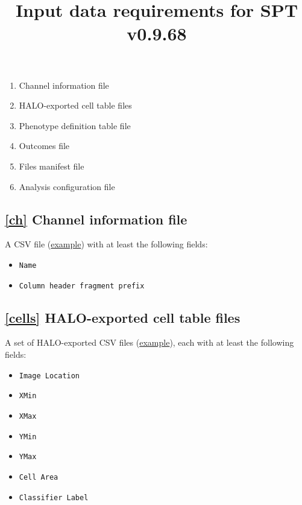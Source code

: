 \documentclass[14pt]{article}
\begin{document}
\title{Input data requirements for SPT v0.9.68}
\author{}
\maketitle

\begin{center}
\begin{varwidth}{0.4\textwidth}
\begin{enumerate}
  \itemsep0em
  \item{\label{ch}Channel information file}
  \item{\label{cells}HALO-exported cell table files}
  \item{\label{pheno}Phenotype definition table file}
  \item{\label{outcomes}Outcomes file}
  \item{\label{files}Files manifest file}
  \item{\label{run}Analysis configuration file}
\end{enumerate}
\end{varwidth}
\end{center}

\newpage

\subsection*{\ref{ch} Channel information file}
A CSV file (\href{https://github.com/nadeemlab/SPT/blob/main/tests/data/elementary_phenotypes.csv}{example})
 with at least the following fields:

\begin{itemize}
  \itemsep0em
  \item[]{\colorbox{yellow!25}{\texttt{Name}}}
  \item[]{\colorbox{yellow!25}{\texttt{Column header fragment prefix}}}
\end{itemize}

\subsection*{\ref{cells} HALO-exported cell table files} A set of HALO-exported CSV files (\href{https://github.com/nadeemlab/SPT/blob/main/tests/data/2779f21192cb0ce1479b2bf7fb20ebba.csv}{example}), each with at least the following fields:

\begin{itemize}
  \itemsep0em
  \item[]{\colorbox{yellow!25}{\texttt{Image Location}}}
  \item[]{\colorbox{yellow!25}{\texttt{XMin}}}
  \item[]{\colorbox{yellow!25}{\texttt{XMax}}}
  \item[]{\colorbox{yellow!25}{\texttt{YMin}}}
  \item[]{\colorbox{yellow!25}{\texttt{YMax}}}
  \item[]{\colorbox{yellow!25}{\texttt{Cell Area}}}
  \item[]{\colorbox{yellow!25}{\texttt{Classifier Label}}}
\end{itemize}
\end{document}
